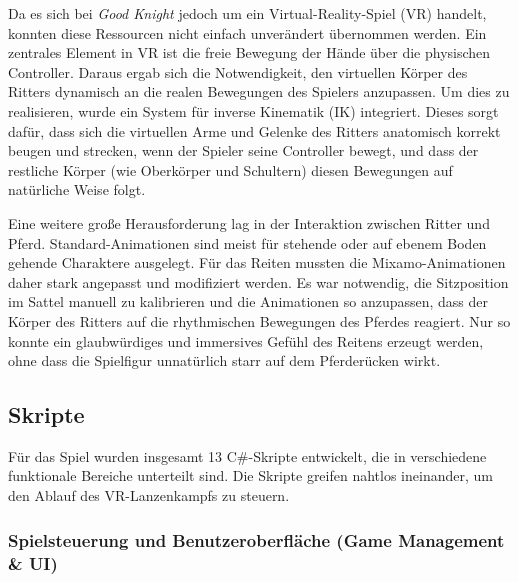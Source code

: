 \documentclass[11pt, a4paper]{article}
\begin{document}
Da es sich bei \textit{Good Knight} jedoch um ein Virtual-Reality-Spiel (VR) handelt, konnten diese Ressourcen nicht einfach unverändert übernommen werden. Ein zentrales Element in VR ist die freie Bewegung der Hände über die physischen Controller. Daraus ergab sich die Notwendigkeit, den virtuellen Körper des Ritters dynamisch an die realen Bewegungen des Spielers anzupassen. Um dies zu realisieren, wurde ein System für inverse Kinematik (IK) integriert. Dieses sorgt dafür, dass sich die virtuellen Arme und Gelenke des Ritters anatomisch korrekt beugen und strecken, wenn der Spieler seine Controller bewegt, und dass der restliche Körper (wie Oberkörper und Schultern) diesen Bewegungen auf natürliche Weise folgt.

Eine weitere große Herausforderung lag in der Interaktion zwischen Ritter und Pferd. Standard-Animationen sind meist für stehende oder auf ebenem Boden gehende Charaktere ausgelegt. Für das Reiten mussten die Mixamo-Animationen daher stark angepasst und modifiziert werden. Es war notwendig, die Sitzposition im Sattel manuell zu kalibrieren und die Animationen so anzupassen, dass der Körper des Ritters auf die rhythmischen Bewegungen des Pferdes reagiert. Nur so konnte ein glaubwürdiges und immersives Gefühl des Reitens erzeugt werden, ohne dass die Spielfigur unnatürlich starr auf dem Pferderücken wirkt.


\subsection{Skripte}
Für das Spiel wurden insgesamt 13 C\#-Skripte entwickelt, die in verschiedene funktionale Bereiche unterteilt sind. Die Skripte greifen nahtlos ineinander, um den Ablauf des VR-Lanzenkampfs zu steuern.

\subsubsection{Spielsteuerung und Benutzeroberfläche (Game Management \& UI)}
\end{document}
